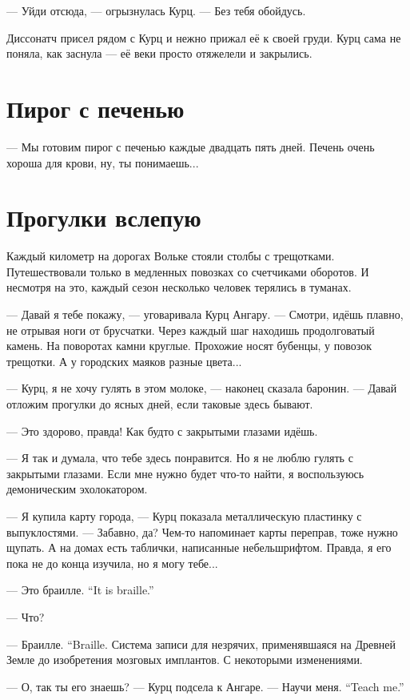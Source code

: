 --- Уйди отсюда, --- огрызнулась Курц.
--- Без тебя обойдусь.

Диссонатч присел рядом с Курц и нежно прижал её к своей груди.
Курц сама не поняла, как заснула --- её веки просто отяжелели и закрылись.

\section{Пирог с печенью}

--- Мы готовим пирог с печенью каждые двадцать пять дней.
Печень очень хороша для крови, ну, ты понимаешь...

\section{Прогулки вслепую}

Каждый километр на дорогах Вольке стояли столбы с трещотками.
Путешествовали только в медленных повозках со счетчиками оборотов.
И несмотря на это, каждый сезон несколько человек терялись в туманах.

--- Давай я тебе покажу, --- уговаривала Курц Ангару.
--- Смотри, идёшь плавно, не отрывая ноги от брусчатки.
Через каждый шаг находишь продолговатый камень.
На поворотах камни круглые.
Прохожие носят бубенцы, у повозок трещотки.
А у городских маяков разные цвета...

--- Курц, я не хочу гулять в этом молоке, --- наконец сказала баронин.
--- Давай отложим прогулки до ясных дней, если таковые здесь бывают.

--- Это здорово, правда!
Как будто с закрытыми глазами идёшь.

--- Я так и думала, что тебе здесь понравится.
Но я не люблю гулять с закрытыми глазами.
Если мне нужно будет что-то найти, я воспользуюсь демоническим эхолокатором.

--- Я купила карту города, --- Курц показала металлическую пластинку с выпуклостями.
--- Забавно, да?
Чем-то напоминает карты переправ, тоже нужно щупать.
А на домах есть таблички, написанные небельшрифтом. %
Правда, я его пока не до конца изучила, но я могу тебе...

{--- Это браилле.}
{``It is braille.''}

--- Что?

{--- Браилле.}
{``Braille.}
Система записи для незрячих, применявшаяся на Древней Земле до изобретения мозговых имплантов.
С некоторыми изменениями.

--- О, так ты его знаешь? --- Курц подсела к Ангаре.
{--- Научи меня.}
{``Teach me.''}

